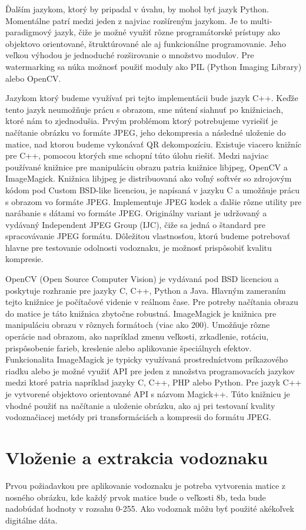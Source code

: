 Ďalším jazykom, ktorý by pripadal v úvahu, by mohol byť jazyk Python. Momentálne patrí medzi jeden z najviac rozšíreným jazykom. Je to multi-paradigmový jazyk, čiže je možné využiť rôzne programátorské prístupy ako objektovo orientované, štruktúrované ale aj funkcionálne programovanie. Jeho veľkou výhodou je jednoduché rozširovanie o množstvo modulov. Pre watermarking sa núka možnosť použiť moduly ako PIL (Python Imaging Library) alebo OpenCV.

Jazykom ktorý budeme využívať pri tejto implementácii bude jazyk C++. Keďže tento jazyk neumožňuje prácu s obrazom, sme nútení siahnuť po knižniciach, ktoré nám to zjednodušia. Prvým problémom ktorý potrebujeme vyriešiť je načítanie obrázku vo formáte JPEG, jeho dekompresia a následné uloženie do matice, nad ktorou budeme vykonávať QR dekompozíciu. Existuje viacero knižníc pre C++, pomocou ktorých sme schopní túto úlohu riešiť. Medzi najviac používané knižnice pre manipuláciu obrazu patria knižnice libjpeg, OpenCV a ImageMagick.
Knižnica libjpeg je distribuovaná ako voľný softvér so zdrojovým kódom pod Custom BSD-like licenciou, je napísaná v jazyku C a umožňuje prácu s obrazom vo formáte JPEG. Implementuje JPEG kodek a ďalšie rôzne utility pre narábanie s dátami vo formáte JPEG. Originálny variant je udržovaný a vydávaný Independent JPEG Group (IJC), čiže sa jedná o štandard pre spracovávanie JPEG formátu. Dôležitou vlastnosťou, ktorú budeme potrebovať hlavne pre testovanie odolnosti vodoznaku, je možnosť prispôsobiť kvalitu kompresie.

OpenCV (Open Source Computer Vision) je vydávaná pod BSD licenciou a poskytuje rozhranie pre jazyky C, C++, Python a Java. Hlavným zameraním tejto knižnice je počítačové videnie v reálnom čase. Pre potreby načítania obrazu do matice je táto knižnica zbytočne robustná.
ImageMagick je knižnica pre manipuláciu obrazu v rôznych formátoch (viac ako 200). Umožňuje rôzne operácie nad obrazom, ako napríklad zmenu veľkosti, zrkadlenie, rotáciu, prispôsobenie farieb, kreslenie alebo aplikovanie špeciálnych efektov. Funkcionalita ImageMagick je typicky využívaná prostredníctvom príkazového riadku alebo je možné využiť API pre jeden z množstva programovacích jazykov medzi ktoré patria napríklad jazyky C, C++, PHP alebo Python. Pre jazyk C++ je vytvorené objektovo orientované API s názvom Magick++. Túto knižnicu je vhodné použiť na načítanie a uloženie obrázku, ako aj pri testovaní kvality vodoznačiacej metódy pri transformáciách a kompresii do formátu JPEG.

\section{Vloženie a extrakcia vodoznaku} \label{vlozenie}
Prvou požiadavkou pre aplikovanie vodoznaku je potreba vytvorenia matice z nosného obrázku, kde každý prvok matice bude o veľkosti 8b, teda bude nadobúdať hodnoty v rozsahu 0-255. Ako vodoznak môžu byť použité akékoľvek digitálne dáta.

